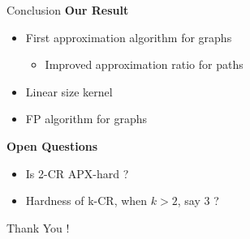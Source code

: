 \begin{frame}{Conclusion}
\textbf{Our Result}
	\pause
	\begin{itemize}
	\item First approximation algorithm for graphs
		\begin{itemize}
		\pause\item
		Improved approximation ratio for paths 
		\end{itemize}
	
	\pause\item
	Linear size kernel
	
	\pause\item
	FP algorithm for graphs
	
	\end{itemize}

\pause
\textbf{Open Questions}
	\begin{itemize}
	
	\pause\item
	Is 2-CR APX-hard ?
	
	\pause\item
	Hardness of k-CR, when $k > 2$, say 3 ?
	
	\end{itemize}

\pause
\begin{center}
\Huge Thank You !
\end{center}

\end{frame}